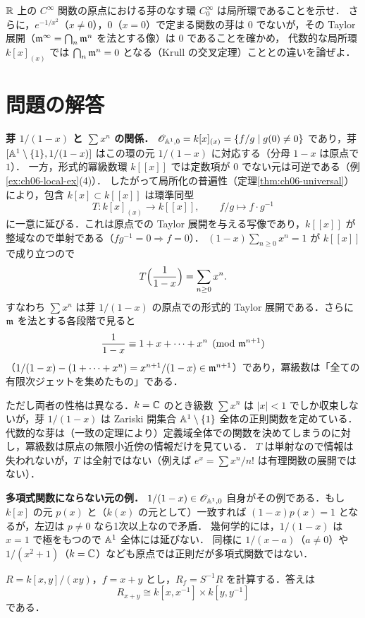 $\mathbb{R}$ 上の $C^\infty$ 関数の原点における芽のなす環 $C^\infty_0$ は局所環であることを示せ．
さらに，$e^{-1/x^2}$（$x\neq0$），$0$（$x=0$）で定まる関数の芽は $0$ でないが，その Taylor 展開（$\mathfrak{m}^\infty=\bigcap_n\mathfrak{m}^n$ を法とする像）は $0$ であることを確かめ，
代数的な局所環 $k[x]_{(x)}$ では $\bigcap_n\mathfrak{m}^n=0$ となる（Krull の交叉定理）こととの違いを論ぜよ．

\section*{問題の解答}

\textbf{芽 $1/(1-x)$ と $\sum x^n$ の関係．}
$\mathscr{O}_{\mathbb{A}^1,0}=k[x]_{(x)}=\{f/g\mid g(0)\ne0\}$ であり，芽 $[\mathbb{A}^1\setminus\{1\},1/(1-x)]$ はこの環の元 $1/(1-x)$ に対応する（分母 $1-x$ は原点で $1$）．
一方，形式的冪級数環 $k[[x]]$ では定数項が $0$ でない元は可逆である（例\ref{ex:ch06-local-ex}(4)）．
したがって局所化の普遍性（定理\ref{thm:ch06-universal}）により，包含 $k[x]\subset k[[x]]$ は環準同型
\[
  T\colon k[x]_{(x)}\longrightarrow k[[x]],\qquad f/g\longmapsto f\cdot g^{-1}
\]
に一意に延びる．これは原点での Taylor 展開を与える写像であり，$k[[x]]$ が整域なので単射である（$fg^{-1}=0\Rightarrow f=0$）．
$(1-x)\sum_{n\ge0}x^n=1$ が $k[[x]]$ で成り立つので
\[
  T\Bigl(\frac1{1-x}\Bigr)=\sum_{n\ge0}x^n .
\]
すなわち $\sum x^n$ は芽 $1/(1-x)$ の原点での形式的 Taylor 展開である．さらに $\mathfrak{m}$ を法とする各段階で見ると
\[
  \frac1{1-x}\equiv1+x+\cdots+x^n\pmod{\mathfrak{m}^{n+1}}
\]
（$1/(1-x)-(1+\cdots+x^n)=x^{n+1}/(1-x)\in\mathfrak{m}^{n+1}$）であり，冪級数は「全ての有限次ジェットを集めたもの」である．

ただし両者の性格は異なる．$k=\mathbb{C}$ のとき級数 $\sum x^n$ は $|x|<1$ でしか収束しないが，芽 $1/(1-x)$ は Zariski 開集合 $\mathbb{A}^1\setminus\{1\}$ 全体の正則関数を定めている．
代数的な芽は（一致の定理により）定義域全体での関数を決めてしまうのに対し，冪級数は原点の無限小近傍の情報だけを見ている．
$T$ は単射なので情報は失われないが，$T$ は全射ではない（例えば $e^x=\sum x^n/n!$ は有理関数の展開ではない）．

\textbf{多項式関数にならない元の例．}
$1/(1-x)\in\mathscr{O}_{\mathbb{A}^1,0}$ 自身がその例である．もし $k[x]$ の元 $p(x)$ と（$k(x)$ の元として）一致すれば $(1-x)p(x)=1$ となるが，左辺は $p\ne0$ なら1次以上なので矛盾．
幾何学的には，$1/(1-x)$ は $x=1$ で極をもつので $\mathbb{A}^1$ 全体には延びない．
同様に $1/(x-a)$（$a\ne0$）や $1/(x^2+1)$（$k=\mathbb{C}$）なども原点では正則だが多項式関数ではない．

$R=k[x,y]/(xy)$，$f=x+y$ とし，$R_f=S^{-1}R$ を計算する．答えは
\[
  R_{x+y}\cong k[x,x^{-1}]\times k[y,y^{-1}]
\]
である．

